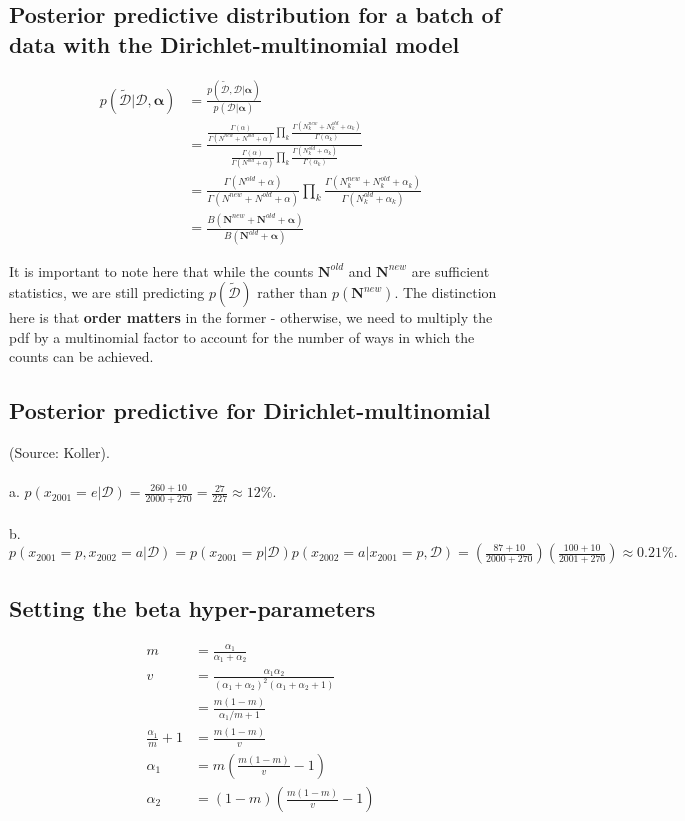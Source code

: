 \subsection{Posterior predictive distribution for a batch of data with the Dirichlet-multinomial model}
\begin{align*}
p(\tilde{\mathcal{D}}|\mathcal{D},\bm\alpha) &= \frac{p(\tilde{\mathcal{D}},\mathcal{D}|\bm\alpha)}{p(\mathcal{D}|\bm\alpha)}\\
&= \frac{
	\frac{\Gamma(\alpha)}{\Gamma(N^{new}+N^{old}+\alpha)} \prod_{k} \frac{\Gamma(N_k^{new}+N_k^{old}+\alpha_k)}{\Gamma(\alpha_k)}
}{
	\frac{\Gamma(\alpha)}{\Gamma(N^{old}+\alpha)} \prod_{k} \frac{\Gamma(N_k^{old}+\alpha_k)}{\Gamma(\alpha_k)}
}\\
&= \frac{\Gamma(N^{old}+\alpha)}{\Gamma(N^{new}+N^{old}+\alpha)} \prod_{k} \frac{\Gamma(N_k^{new}+N_k^{old}+\alpha_k)}{\Gamma(N_k^{old}+\alpha_k)}\\
&= \frac{B(\mathbf{N}^{new}+\mathbf{N}^{old}+\bm\alpha)}{B(\mathbf{N}^{old}+\bm\alpha)}
\end{align*}

It is important to note here that while the counts $\mathbf{N}^{old}$ and $\mathbf{N}^{new}$ are sufficient statistics, we are still predicting $p(\tilde{\mathcal{D}})$ rather than $p(\mathbf{N}^{new})$. The distinction here is that \textbf{order matters} in the former - otherwise, we need to multiply the pdf by a multinomial factor to account for the number of ways in which the counts can be achieved.

\subsection{Posterior predictive for Dirichlet-multinomial}
(Source: Koller).\\\\
a. $p(x_{2001}=e|\mathcal{D}) = \frac{260+10}{2000+270} = \frac{27}{227} \approx 12\%.$\\\\
b. $p(x_{2001}=p,x_{2002}=a|\mathcal{D}) = p(x_{2001}=p|\mathcal{D})p(x_{2002}=a|x_{2001}=p,\mathcal{D}) = \left(\frac{87+10}{2000+270}\right) \left(\frac{100+10}{2001+270}\right) \approx 0.21\%.$

\subsection{Setting the beta hyper-parameters}
\begin{align*}
m &= \frac{\alpha_1}{\alpha_1+\alpha_2}\\
v &= \frac{\alpha_1\alpha_2}{(\alpha_1+\alpha_2)^2(\alpha_1+\alpha_2+1)}\\
&= \frac{m(1-m)}{\alpha_1/m+1}\\
\frac{\alpha_1}{m}+1 &= \frac{m(1-m)}{v}\\
\alpha_1 &= m\left(\frac{m(1-m)}{v}-1\right)\\
\alpha_2 &= (1-m)\left(\frac{m(1-m)}{v}-1\right)
\end{align*}

